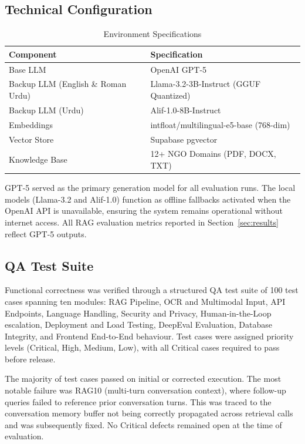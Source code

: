 \subsection{Technical Configuration}

\begin{table}[H]
\centering
\begin{tabular}{|l|l|}
\hline
\textbf{Component} & \textbf{Specification} \\ \hline
Base LLM & OpenAI GPT-5 \\ \hline
Backup LLM (English \& Roman Urdu) & Llama-3.2-3B-Instruct (GGUF Quantized) \\ \hline
Backup LLM (Urdu) & Alif-1.0-8B-Instruct \cite{alif_instruct_2024} \\ \hline
Embeddings & intfloat/multilingual-e5-base (768-dim) \\ \hline
Vector Store & Supabase pgvector \\ \hline
Knowledge Base & 12+ NGO Domains (PDF, DOCX, TXT) \\ \hline
\end{tabular}
\caption{Environment Specifications}
\end{table}

GPT-5 served as the primary generation model for all evaluation runs. The local 
models (Llama-3.2 and Alif-1.0) function as offline fallbacks activated when the 
OpenAI API is unavailable, ensuring the system remains operational without 
internet access. All RAG evaluation metrics reported in 
Section~\ref{sec:results} reflect GPT-5 outputs.

\subsection{QA Test Suite}

Functional correctness was verified through a structured QA test suite of 100 
test cases spanning ten modules: RAG Pipeline, OCR and Multimodal Input, API 
Endpoints, Language Handling, Security and Privacy, Human-in-the-Loop 
escalation, Deployment and Load Testing, DeepEval Evaluation, Database Integrity, 
and Frontend End-to-End behaviour. Test cases were assigned priority levels 
(Critical, High, Medium, Low), with all Critical cases required to pass before 
release.

The majority of test cases passed on initial or corrected execution. The most 
notable failure was RAG10 (multi-turn conversation context), where follow-up 
queries failed to reference prior conversation turns. This was traced to the 
conversation memory buffer not being correctly propagated across retrieval calls 
and was subsequently fixed. No Critical defects remained open at the time of 
evaluation.

